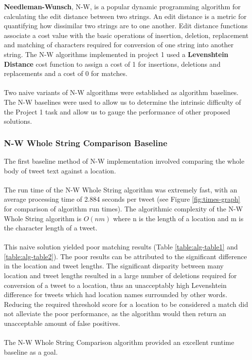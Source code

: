 \documentclass[11pt,a4paper]{article}
\begin{document}
\textbf{Needleman-Wunsch}, N-W, is a popular dynamic programming algorithm for calculating the edit distance between two strings. An edit distance is a metric for quantifying how dissimilar two strings are to one another. Edit distance functions associate a cost value with the basic operations of insertion, deletion, replacement and matching of characters required for conversion of one string into another string. The N-W algorithms implemented in project 1 used a \textbf{Levenshtein Distance} cost function to assign a cost of 1 for insertions, deletions and replacements and a cost of 0 for matches.\\\\
Two naive variants of N-W algorithms were established as algorithm baselines. The N-W baselines were used to allow us to determine the intrinsic difficulty of the Project 1 task and allow us to gauge the performance of other proposed solutions.

\subsubsection{N-W Whole String Comparison Baseline}

The first baseline method of N-W implementation involved comparing the whole body of tweet text against a location.\\\\
The run time of the N-W Whole String algorithm was extremely fast, with an average processing time of 2.884 seconds per tweet (see Figure \ref{fig:times-graph} for comparison of algorithm run times). The algorithmic complexity of the N-W Whole String algorithm is $O(nm)$ where n is the length of a location and m is the character length of a tweet. \\\\ 
This naive solution yielded poor matching results (Table \ref{table:alg-table1} and \ref{table:alg-table2}). The poor results can be attributed to the significant difference in the location and tweet lengths. The significant disparity between many location and tweet lengths resulted in a large number of deletions required for conversion of a tweet to a location, thus an unacceptably high Levenshtein difference for tweets which had location names surrounded by other words. Reducing the required threshold score for a location to be considered a match did not alleviate the poor performance, as the algorithm would then return an unacceptable amount of false positives.\\\\
The N-W Whole String Comparison algorithm provided an excellent runtime baseline as a goal.
\end{document}
